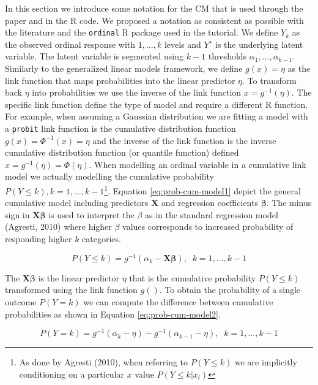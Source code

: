 \documentclass[
  man,floatsintext]{apa6}
\begin{document}
In this section we introduce some notation for the CM that is used through the paper and in the R code. We proposed a notation as consistent as possible with the literature and the \texttt{ordinal} R package used in the tutorial. We define \(Y_k\) as the observed ordinal response with \(1, \dots, k\) levels and \(Y^\star\) is the underlying latent variable. The latent variable is segmented using \(k - 1\) thresholds \(\alpha_1, \dots, \alpha_{k - 1}\). Similarly to the generalized linear models framework, we define \(g(x) = \eta\) as the link function that maps probabilities into the linear predictor \(\eta\). To transform back \(\eta\) into probabilities we use the inverse of the link function \(x = g^{-1}(\eta)\). The specific link function define the type of model and require a different R function. For example, when assuming a Gaussian distribution we are fitting a model with a \texttt{probit} link function is the cumulative distribution function \(g(x) = \Phi^{-1}(x) = \eta\) and the inverse of the link function is the inverse cumulative distribution function (or quantile function) defined \(x = g^{-1}(\eta) = \Phi(\eta)\). When modelling an ordinal variable in a cumulative link model we actually modelling the cumulative probability \(P(Y \leq k), k = 1, \dots, k - 1\)\footnote{As done by Agresti (2010), when referring to \(P(Y \leq k)\) we are implicitly conditioning on a particular \(x\) value \(P(Y \leq k | x_i)\)}. Equation \eqref{eq:prob-cum-model1} depict the general cumulative model including predictors \(\mathbf{X}\) and regression coefficients \(\boldsymbol{\beta}\). The minus sign in \(\mathbf{X} \boldsymbol{\beta}\) is used to interpret the \(\beta\) as in the standard regression model (Agresti, 2010) where higher \(\beta\) values corresponds to increased probability of responding higher \(k\) categories.

\begin{equation} 
P(Y \leq k) = g^{-1}(\alpha_k - \mathbf{X} \boldsymbol{\beta}), \;\;k = 1, \dots, k - 1
\label{eq:prob-cum-model1}
\end{equation}

The \(\mathbf{X} \boldsymbol{\beta}\) is the linear predictor \(\eta\) that is the cumulative probability \(P(Y \leq k)\) transformed using the link function \(g()\). To obtain the probability of a single outcome \(P(Y = k)\) we can compute the difference between cumulative probabilities as shown in Equation \eqref{eq:prob-cum-model2}.

\begin{equation} 
P(Y = k) = g^{-1}(\alpha_k - \eta) -  g^{-1}(\alpha_{k - 1} - \eta), \;\;k = 1, \dots, k - 1
\label{eq:prob-cum-model2}
\end{equation}
\end{document}
